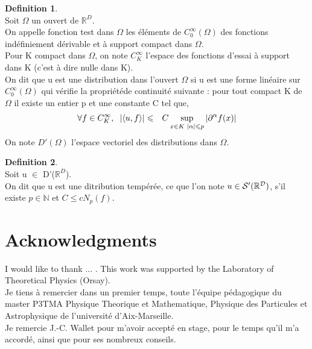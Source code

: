 \documentclass[a4paper,11pt]{article} %
\theoremstyle{plain}
\theoremstyle{definition}
\newtheorem{dfn}{Definition}[section]
\theoremstyle{remark}
\numberwithin{equation}{section}
\numberwithin{equation}{subsection}
\numberwithin{figure}{section}
\begin{document}
\begin{dfn} $\left. \right. $\\
 Soit $\Omega$ un ouvert de $\mathbb{R}^{D}$.\\
On appelle fonction test dans $\Omega$ les éléments de $C_{0}^{\infty}(\Omega)$ des fonctions indéfiniement dérivable et à support compact dans $\Omega$.\\
Pour K compact dans $\Omega$, on note $C^{\infty}_{K}$ l'espace des fonctions d'essai à support dans K (c'est à dire nulle dans K). \\
On dit que u est une distribution dans l'ouvert $\Omega$ si u est une forme linéaire sur $C^{\infty}_{0}(\Omega)$ qui vérifie la propriétéde continuité suivante : pour tout compact K de $\Omega$ il existe un entier p et une constante C tel que,
\begin{eqnarray*}
 \forall f \in C^{\infty}_{K}, \hspace{2mm} 
\left| \langle u,f \rangle \right|  &\leqslant&  C  \sup_{x \in K  \hspace{1mm} |\alpha| \leqslant p} \left| \partial^{\alpha} f(x) \right|
\end{eqnarray*}
On note $D'(\Omega)$ l'espace vectoriel des distributions dans $\Omega$.
\end{dfn}
\begin{dfn} $\left. \right. $\\
 Soit u $\in$ D'($\mathbb{R}^{D}$).\\
 On dit que u est une ditribution tempérée, ce que l'on note $u \in \cal{S}'(\mathbb{R}^{D})$, s'il existe 
$p \in \mathbb{N}$ et $C \leqslant c N_{p}(f)$.
\end{dfn}

\section{Acknowledgments}

I would like to thank ... . This work was supported by the Laboratory of Theoretical Physics (Orsay).\\

Je tiens à remercier dans un premier temps, toute l’équipe pédagogique du master P3TMA Physique Theorique et Mathematique, Physique des Particules et Astrophysique de l'université d'Aix-Marseille.  \\

Je remercie J.-C. Wallet pour m'avoir accepté en stage, pour le temps qu'il m'a accordé, ainsi que pour ses nombreux conseils.\\
\end{document}

